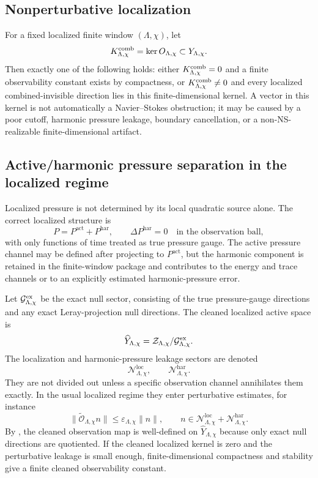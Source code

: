 \documentclass[11pt]{article}
\numberwithin{equation}{section}
\theoremstyle{plain}
\theoremstyle{definition}
\theoremstyle{remark}
\newcommand{\eps}{\varepsilon}
\newcommand{\loc}{\mathrm{loc}}
\newcommand{\har}{\mathrm{har}}
\newcommand{\calG}{\mathcal G}
\newcommand{\calN}{\mathcal N}
\newcommand{\calO}{\mathcal O}
\newcommand{\calZ}{\mathcal Z}
\newcommand{\act}{\mathrm{act}}
\begin{document}
\subsection{Nonperturbative localization}

For a fixed localized finite window \((\Lambda,\chi)\), let
\[
        K^{\rm comb}_{\Lambda,\chi}=\ker O_{\Lambda,\chi}\subset Y_{\Lambda,\chi}.
\]
Then exactly one of the following holds: either \(K^{\rm comb}_{\Lambda,\chi}=0\)
and a finite observability constant exists by compactness, or
\(K^{\rm comb}_{\Lambda,\chi}\ne0\) and every localized combined-invisible
direction lies in this finite-dimensional kernel.  A vector in this kernel is
not automatically a Navier--Stokes obstruction; it may be caused by a poor
cutoff, harmonic pressure leakage, boundary cancellation, or a non-NS-realizable
finite-dimensional artifact.


\subsection{Active/harmonic pressure separation in the localized regime}

Localized pressure is not determined by its local quadratic source alone.  The correct localized structure is
\[
        P=P^{\act}+P^{\har},
        \qquad
        \Delta P^{\har}=0
        \quad\text{in the observation ball},
\]
with only functions of time treated as true pressure gauge.  The active pressure channel may be defined after projecting to \(P^{\act}\), but the harmonic component is retained in the finite-window package and contributes to the energy and trace channels or to an explicitly estimated harmonic-pressure error.

Let \(\calG^{\rm ex}_{\Lambda,\chi}\) be the exact null sector, consisting of the true pressure-gauge directions and any exact Leray-projection null directions.  The cleaned localized active space is
\[
        \widehat Y_{\Lambda,\chi}
        =
        \calZ_{\Lambda,\chi}/\calG^{\rm ex}_{\Lambda,\chi}.
\]
The localization and harmonic-pressure leakage sectors are denoted
\[
        \calN^{\loc}_{\Lambda,\chi},
        \qquad
        \calN^{\har}_{\Lambda,\chi}.
\]
They are not divided out unless a specific observation channel annihilates them exactly.  In the usual localized regime they enter perturbative estimates, for instance
\[
        \|\widetilde{\calO}_{\Lambda,\chi} n\|
        \le
        \eps_{\Lambda,\chi}\|n\|,
        \qquad
        n\in \calN^{\loc}_{\Lambda,\chi}+\calN^{\har}_{\Lambda,\chi}.
\]
By , the cleaned observation map is well-defined on \(\widehat Y_{\Lambda,\chi}\) because only exact null directions are quotiented.  If the cleaned localized kernel is zero and the perturbative leakage is small enough, finite-dimensional compactness and stability give a finite cleaned observability constant.
\end{document}
